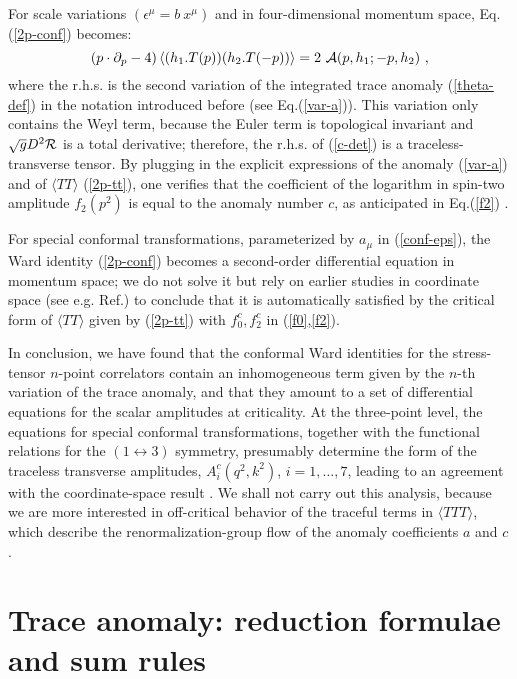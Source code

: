\documentclass[11pt]{article}
\newcommand{\beq}{\begin{equation}}
\newcommand{\eeq}{\end{equation}}
\def\eps{\epsilon}
\def\TTT{\bra TTT\ket}
\def\TT{\bra TT\ket}
\def\bra{\langle}
\def\ket{\rangle}
\begin{document}
For scale variations $(\eps^\mu=b\ x^\mu)$
and in four-dimensional momentum space, Eq.(\ref{2p-conf}) becomes:
\beq
\left(p\cdot \partial_p -4 \right) 
\bra(h_1. T(p))(h_2. T(-p)) \ket = 2\ {\cal A}(p,h_1;-p,h_2)\ ,
\label{c-det}\eeq
where the r.h.s. is the second variation of the integrated 
trace anomaly (\ref{theta-def}) in the notation introduced
before (see Eq.(\ref{var-a})). This variation
only contains the Weyl term, because the Euler term is topological
invariant and $\sqrt{g} D^2{\cal R}$ is a total derivative;
therefore, the r.h.s. of (\ref{c-det}) 
is a traceless-transverse tensor.
By plugging in the explicit expressions of the anomaly (\ref{var-a})
and of $\TT$ (\ref{2p-tt}), one
verifies that the coefficient of the logarithm
in spin-two amplitude $f_2\left(p^2 \right)$ is equal to the anomaly 
number $c$, as anticipated in Eq.(\ref{f2}) \cite{duff}\cite{cfl}.

For special conformal transformations, parameterized by $a_\mu$ in 
(\ref{conf-eps}), the Ward identity (\ref{2p-conf}) becomes a second-order
differential equation in momentum space; we do not solve it
but rely on earlier studies in coordinate space (see e.g. Ref.\cite{cfl})
to conclude that it is automatically satisfied by 
the critical form of $\TT$ given by (\ref{2p-tt}) 
with $f^c_0, f^c_2$ in (\ref{f0},\ref{f2}).

In conclusion, we have found that the conformal Ward identities
for the stress-tensor $n$-point correlators
contain an inhomogeneous term given by the $n$-th variation of
the trace anomaly, and that they amount to a set of differential 
equations for the scalar amplitudes at criticality. 
At the three-point level, the equations for special conformal 
transformations, together with the functional relations for the
$(1\leftrightarrow 3)$ symmetry, presumably determine the form of the
traceless transverse amplitudes, 
$A_i^c(q^2,k^2)$, $i=1,\dots,7$, leading to an
agreement with the coordinate-space result \cite{eo}\cite{ol}.
We shall not carry out this analysis, 
because we are more interested in off-critical behavior of the 
traceful terms in $\TTT$, which describe the renormalization-group
flow of the anomaly coefficients $a$ and $c$.


 
 
\section{Trace anomaly: reduction formulae and sum rules}
\end{document}
